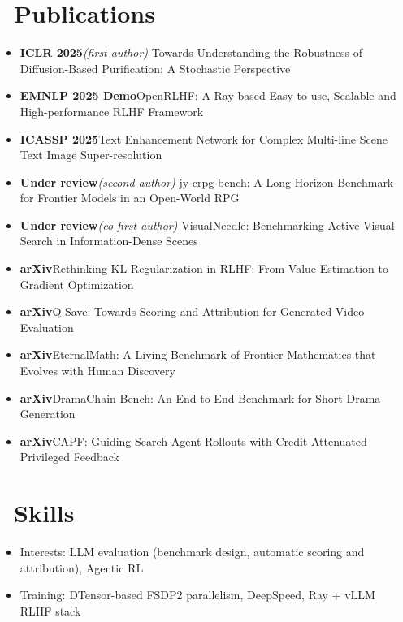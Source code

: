 \documentclass{resume}
\begin{document}
\section{\faPrint\ Publications}
{\small
\begin{itemize}
  \item \textbf{ICLR 2025}\quad \textit{(first author)} Towards Understanding the Robustness of Diffusion-Based Purification: A Stochastic Perspective
  \item \textbf{EMNLP 2025 Demo}\quad OpenRLHF: A Ray-based Easy-to-use, Scalable and High-performance RLHF Framework
  \item \textbf{ICASSP 2025}\quad Text Enhancement Network for Complex Multi-line Scene Text Image Super-resolution
  \item \textbf{Under review}\quad \textit{(second author)} jy-crpg-bench: A Long-Horizon Benchmark for Frontier Models in an Open-World RPG
  \item \textbf{Under review}\quad \textit{(co-first author)} VisualNeedle: Benchmarking Active Visual Search in Information-Dense Scenes
  \item \textbf{arXiv}\quad Rethinking KL Regularization in RLHF: From Value Estimation to Gradient Optimization
  \item \textbf{arXiv}\quad Q-Save: Towards Scoring and Attribution for Generated Video Evaluation
  \item \textbf{arXiv}\quad EternalMath: A Living Benchmark of Frontier Mathematics that Evolves with Human Discovery
  \item \textbf{arXiv}\quad DramaChain Bench: An End-to-End Benchmark for Short-Drama Generation
  \item \textbf{arXiv}\quad CAPF: Guiding Search-Agent Rollouts with Credit-Attenuated Privileged Feedback
\end{itemize}
\par}

\section{\faCogs\ Skills}
\begin{itemize}
  \item Interests: LLM evaluation (benchmark design, automatic scoring and attribution), Agentic RL
  \item Training: DTensor-based FSDP2 parallelism, DeepSpeed, Ray + vLLM RLHF stack
\end{itemize}
\end{document}
